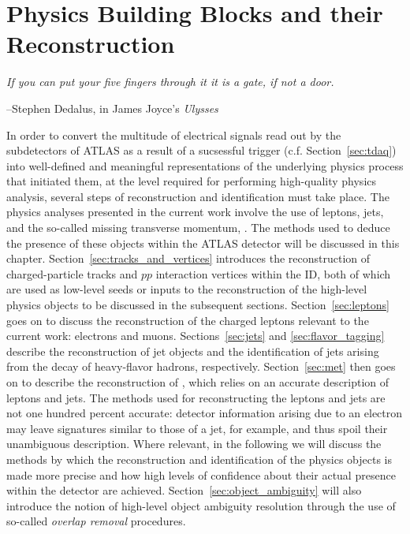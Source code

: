 \chapter{Physics Building Blocks and their Reconstruction}
\label{chap:objects}

\epigraph{\textit{If you can put your five fingers through it it is a gate, if not a door.}}{--Stephen Dedalus, in James Joyce's \textit{Ulysses}}

In order to convert the multitude of electrical signals read out by the subdetectors
of ATLAS as a result of a sucsessful trigger (c.f. Section~\ref{sec:tdaq})
into well-defined and meaningful representations of the underlying physics process
that initiated them, at the level required for performing high-quality physics analysis,
several steps of reconstruction and identification must take place.
The physics analyses presented in the current work involve the use of leptons,
jets, and the so-called missing transverse momentum, \ptmiss.
The methods used to deduce the presence of these objects within the ATLAS detector
will be discussed in this chapter.
Section~\ref{sec:tracks_and_vertices} introduces the reconstruction of charged-particle
tracks and $pp$ interaction vertices within the ID, both of which are used as low-level seeds or inputs to the
reconstruction of the high-level physics objects to be discussed in the subsequent
sections.
Section~\ref{sec:leptons} goes on to discuss the reconstruction of the charged leptons
relevant to the current work: electrons and muons.
Sections~\ref{sec:jets} and \ref{sec:flavor_tagging} describe the reconstruction
of jet objects and the identification of jets arising from the decay of heavy-flavor hadrons,
respectively.
Section~\ref{sec:met} then goes on to describe the reconstruction of \ptmiss,
which relies on an accurate description of leptons and jets.
The methods used for reconstructing the leptons and jets are not one hundred percent
accurate: detector information arising due to an electron may leave signatures
similar to those of a jet, for example, and thus spoil their unambiguous description.
Where relevant, in the following we will discuss the methods by which the reconstruction
and identification of the physics objects is made more precise and how high levels
of confidence about their actual presence within the detector are achieved.
Section~\ref{sec:object_ambiguity} will also introduce the notion of high-level
object ambiguity resolution through the use of so-called \textit{overlap removal}
procedures.



